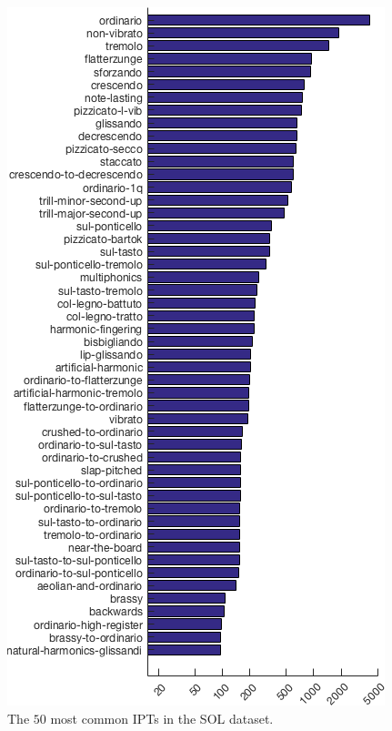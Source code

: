 \begin{figure}
\centering
\includegraphics[width=0.98\linewidth]{./figs/histogram/histogram_modes.png}
\caption{The $50$ most common IPTs in the SOL dataset.}
\label{fig:technique-histogram}
\end{figure}

